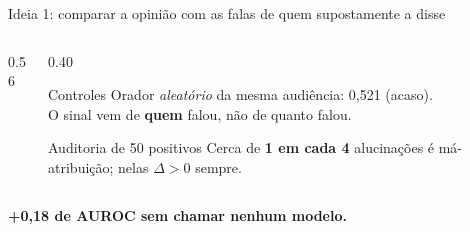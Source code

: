 \documentclass[aspectratio=169,11pt]{beamer}
\begin{document}
\begin{frame}{Ideia 1: comparar a opinião com as falas de quem supostamente a disse}
  \begin{columns}[c]
    \begin{column}{0.56\textwidth}
      \begin{table}\centering\small
      \end{table}
    \end{column}
    \begin{column}{0.40\textwidth}
      \begin{block}{Controles}\small
        Orador \emph{aleatório} da mesma audiência: 0,521 (acaso).\\[2pt]
        O sinal vem de \textbf{quem} falou, não de quanto falou.
      \end{block}
      \begin{exampleblock}{Auditoria de 50 positivos}\small
        Cerca de \textbf{1 em cada 4} alucinações é má-atribuição; nelas $\Delta > 0$ sempre.
      \end{exampleblock}
    \end{column}
  \end{columns}
  \vspace{0.2cm}
  \centering\textbf{+0,18 de AUROC sem chamar nenhum modelo.}
\end{frame}
\end{document}
